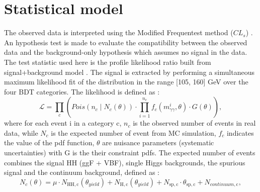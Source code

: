 \section{Statistical model}
\label{HHyybb:Stat}

The observed data is interpreted using the Modified Frequentest method ($CL_s$) \cite{CL_s}. An hypothesis test is made to evaluate the compatibility between the observed data and the background-only hypothesis which assumes no signal in the data. The test statistic used here is the profile likelihood ratio \cite{Z} built from signal+background model . The signal is extracted by performing a simultaneous maximum likelihood fit of the \myy distribution in the range [105, 160] GeV over the four BDT categories. The likelihood is defined as : 
\begin{equation}
    \mathcal{L}=\prod_{c}\left(Pois\left(n_{c}
    \mid N_{c}(\theta)\right) \cdot \prod_{i=1}^{n_{c}}
    f_{c}\left(m_{\gamma \gamma}^{i}, \theta\right) \cdot G(\theta)\right),
\end{equation}
where for each event i in a category c, $n_c$ is the observed number of events in real data, while $N_c$ is the expected number of event from MC simulation, 
$f_c$ indicates the value of the pdf function, $\theta$ are nuisance parameters (systematic uncertainties) with G is the their constraint pdfs. 
The expected number of events combines the signal HH (ggF + VBF), single Higgs backgrounds, the spurious signal and the continuum background, defined as : 
\begin{equation}
    N_{c}(\theta)=\mu \cdot N_{\mathrm{HH},
    \mathrm{c}}\left(\theta_{yield }\right)+N_{\mathrm{H},
    \mathrm{c}}\left(\theta_{yield }\right)+N_{\mathrm{sp},
    \mathrm{c}} \cdot \theta_{\mathrm{sp},
    \mathrm{c}}+N_{continuum , \mathrm{c}},
\end{equation}

